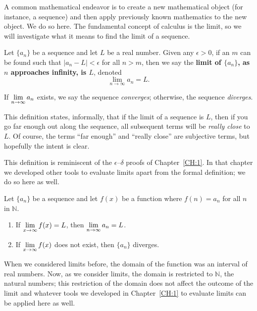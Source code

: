 




A common mathematical endeavor is to create a new mathematical object (for instance, a sequence) and then apply previously known mathematics to the new object. We do so here. The fundamental concept of calculus is the limit, so we will investigate what it means to find the limit of a sequence.

{Let $\{a_n\}$ be a sequence and let $L$ be a real number. Given any $\epsilon>0$, if an $m$ can be found such that $|a_n-L|<\epsilon$ for all $n>m$, then we say the \textbf{limit of $\{a_n\}$, as $n$ approaches infinity, is $L$}, denoted $$\lim_{n\to\infty}a_n = L.$$

If $\displaystyle\lim_{n\to\infty} a_n$ exists, we say the sequence \emph{converges}; otherwise, the sequence \emph{diverges}.
} %

This definition states, informally, that if the limit of a sequence is $L$, then if you go far enough out along the sequence, all subsequent terms will be \emph{really close} to $L$. Of course, the terms ``far enough'' and ``really close'' are subjective terms, but hopefully the intent is clear.

This definition is reminiscent of the $\epsilon$--$\delta$ proofs of Chapter~\ref{CH:1}. In that chapter we developed other tools to evaluate limits apart from the formal definition; we do so here as well.

{Let $\{a_n\}$ be a sequence and let $f(x)$ be a function where $f(n) = a_n$ for all $n$ in $\mathbb{N}$. 
\begin{enumerate}
\item		If $\displaystyle \lim_{x\to\infty} f(x) = L$, then $\displaystyle\lim_{n\to\infty} a_n = L$.
\item		If $\displaystyle \lim_{x\to\infty} f(x)$ does not exist, then $\{a_n\}$ diverges.
\end{enumerate}
} %

When we considered limits before, the domain of the function was an interval of real numbers. Now, as we consider limits, the domain is restricted to $\mathbb{N}$, the natural numbers; this restriction of the domain does not affect the outcome of the limit and whatever tools we developed in Chapter~\ref{CH:1} to evaluate limits can be applied here as well.

